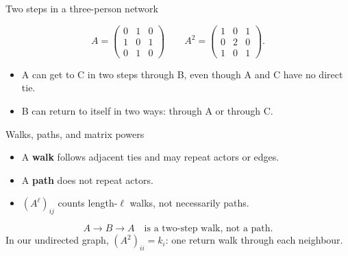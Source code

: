 \documentclass[aspectratio=169,11pt]{beamer}
\begin{document}
\begin{frame}{Two steps in a three-person network}

\begin{center}
\end{center}
\[
A=\begin{pmatrix}0&1&0\\1&0&1\\0&1&0\end{pmatrix}
\qquad
A^2=\begin{pmatrix}1&0&1\\0&2&0\\1&0&1\end{pmatrix}.
\]
\begin{itemize}
\item A can get to C in two steps through B, even though A and C have no direct tie.
\item B can return to itself in two ways: through A or through C.
\end{itemize}

\end{frame}

\begin{frame}{Walks, paths, and matrix powers}

\begin{itemize}
\item A \textbf{walk} follows adjacent ties and may repeat actors or edges.
\medskip\item A \textbf{path} does not repeat actors.
\medskip\item $(A^\ell)_{ij}$ counts length-$\ell$ walks, not necessarily paths.
\end{itemize}
\[A\!\to\! B\!\to\! A\quad\text{is a two-step walk, not a path.}\]
In our undirected graph, $(A^2)_{ii}=k_i$: one return walk through each neighbour.


\end{frame}
\end{document}
